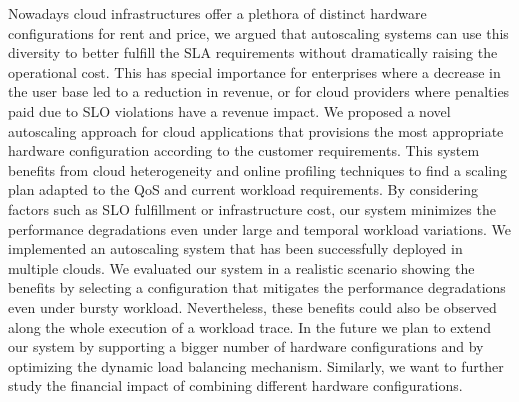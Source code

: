 
Nowadays cloud infrastructures offer a plethora of distinct hardware configurations for rent and price, we argued that autoscaling systems can use this diversity to better fulfill the SLA requirements without dramatically raising the operational cost. This has special importance for enterprises where a decrease in the user base led to a reduction in revenue, or for cloud providers where penalties paid due to SLO violations have a revenue impact. We proposed a novel autoscaling approach for cloud applications that provisions the most appropriate hardware configuration according to the customer requirements. This system benefits from cloud heterogeneity and online profiling techniques to find a scaling plan adapted to the QoS and current workload requirements. By considering factors such as SLO fulfillment or infrastructure cost, our system minimizes the performance degradations even under large and temporal workload variations. We implemented an autoscaling system that has been successfully deployed in multiple clouds. We evaluated our system in a realistic scenario showing the benefits by selecting a configuration that mitigates the performance degradations even under bursty workload. Nevertheless, these benefits could also be observed along the whole execution of a workload trace. In the future we plan to extend our system by supporting a bigger number of hardware configurations and by optimizing 
the dynamic load balancing mechanism. Similarly, we want to further study the financial impact of combining different hardware configurations.








